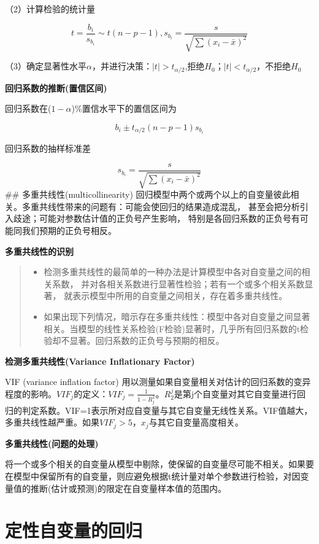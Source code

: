 \documentclass[]{ctexbook}
\providecommand{\tightlist}{%
  \setlength{\itemsep}{0pt}\setlength{\parskip}{0pt}}
\begin{document}
（2）计算检验的统计量

\[t=\frac{b_i}{s_{b_i}}\sim t(n-p-1),s_{b_i}=\frac{s}{\sqrt{\sum(x_i-\bar x)^2}}\]

（3）确定显著性水平\(\alpha\)，并进行决策：\(|t|> t_{\alpha/2}\),拒绝\(H_0\)；\(|t|< t_{\alpha/2}\)，不拒绝\(H_0\)

\textbf{回归系数的推断(置信区间)}

回归系数在(\(1-\alpha\))\%置信水平下的置信区间为

\[b_i\pm t_{\alpha/2}(n-p-1)s_{b_i}\]

回归系数的抽样标准差

\[s_{b_i}=\frac{s}{\sqrt{\sum(x_i-\bar x)^2}}\]
\#\# 多重共线性(multicollinearity)
回归模型中两个或两个以上的自变量彼此相关。多重共线性带来的问题有：可能会使回归的结果造成混乱， 甚至会把分析引入歧途；可能对参数估计值的正负号产生影响， 特别是各回归系数的正负号有可能同我们预期的正负号相反。

\textbf{多重共线性的识别}

\begin{quote}
\begin{itemize}
\tightlist
\item
  检测多重共线性的最简单的一种办法是计算模型中各对自变量之间的相关系数， 并对各相关系数进行显著性检验；若有一个或多个相关系数显著， 就表示模型中所用的自变量之间相关，存在着多重共线性。
\item
  如果出现下列情况，暗示存在多重共线性：模型中各对自变量之间显著相关。当模型的线性关系检验(F检验)显著时，几乎所有回归系数的t检验却不显著。回归系数的正负号与预期的相反。
\end{itemize}
\end{quote}

\textbf{检测多重共线性(Variance Inflationary Factor)}

VIF (variance inflation factor) 用以测量如果自变量相关对估计的回归系数的变异程度的影响。\(VIF_j\)的定义：\(VIF_j=\frac{1}{1-R_j^2}\)。\(R_2^j\)是第j个自变量对其它自变量进行回归的判定系数。VIF=1表示所对应自变量与其它自变量无线性关系。VIF值越大，多重共线性越严重。如果\(VIF_j>5\)，\(x_j\)与其它自变量高度相关。

\textbf{多重共线性(问题的处理)}

将一个或多个相关的自变量从模型中剔除，使保留的自变量尽可能不相关。如果要在模型中保留所有的自变量，则应避免根据t统计量对单个参数进行检验，对因变量值的推断(估计或预测)的限定在自变量样本值的范围内。

\hypertarget{ux5b9aux6027ux81eaux53d8ux91cfux7684ux56deux5f52}{%
\section{定性自变量的回归}\label{ux5b9aux6027ux81eaux53d8ux91cfux7684ux56deux5f52}}
\end{document}
